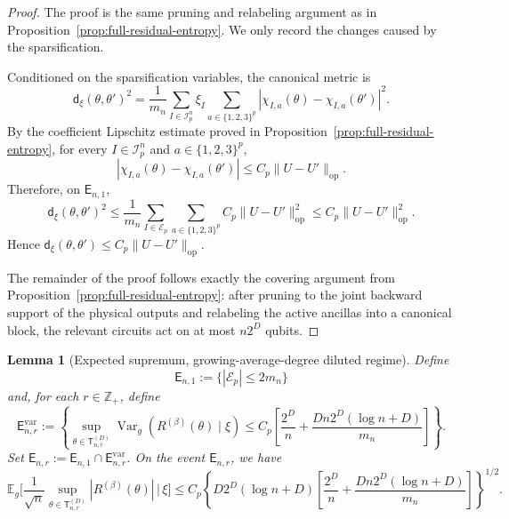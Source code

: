 \documentclass[12pt]{article}
\newtheorem{lemma}[theorem]{Lemma}
\newcommand{\E}{\mathbb{E}}
\newcommand{\mcE}{\mathcal{E}}
\newcommand{\mcI}{\mathcal{I}}
\newcommand{\tvar}{\operatorname{Var}}
\begin{document}
\begin{proof}
The proof is the same pruning and relabeling argument as in
Proposition~\ref{prop:full-residual-entropy}. We only record the changes caused by
the sparsification.

Conditioned on the sparsification variables, the canonical metric is
\[
\mathsf{d}_\xi(\theta,\theta')^2
=
\frac1{m_n}
\sum_{I\in\mcI_p^n}
\xi_I
\sum_{a\in\{1,2,3\}^p}
|\chi_{I,a}(\theta)-\chi_{I,a}(\theta')|^2 .
\]
By the coefficient Lipschitz estimate proved in
Proposition~\ref{prop:full-residual-entropy}, for every \(I\in\mcI_p^n\) and
\(a\in\{1,2,3\}^p\),
\[
    |\chi_{I,a}(\theta)-\chi_{I,a}(\theta')|
    \le
    C_p\|U-U'\|_{\mathrm{op}} .
\]
Therefore, on \(\mathsf E_{n,1}\),
\[
\mathsf{d}_\xi(\theta,\theta')^2
\le
\frac1{m_n}
\sum_{I\in\mcE_p}
\sum_{a\in\{1,2,3\}^p}
C_p\|U-U'\|_{\mathrm{op}}^2  
\le
C_p\|U-U'\|_{\mathrm{op}}^2.
\]
Hence \(\mathsf{d}_\xi(\theta,\theta') \le C_p\|U-U'\|_{\mathrm{op}}\).

The remainder of the proof follows exactly the covering argument from
Proposition~\ref{prop:full-residual-entropy}: after pruning to the joint backward
support of the physical outputs and relabeling the active ancillas into a
canonical block, the relevant circuits act on at most \(n2^D\) qubits. 
\end{proof}



\begin{lemma}[Expected supremum, growing-average-degree diluted regime]
\label{lem:sparse-residual-expected-sup}
Define
\[
    \mathsf E_{n,1}:=\{|\mcE_p|\le 2m_n\}
\]
and, for each \(r\in\mathbb Z_+\), define
\[
\mathsf E_{n,r}^{\mathrm{var}}
:=
\left\{
\sup_{\theta\in\mathsf{T}_{n,r}^{(D)}}
\tvar_g
\left(
R^{(\beta)}(\theta)\mid \xi
\right)
\le
C_p
\left[
\frac{2^D}{n}
+
\frac{Dn2^D(\log n+D)}{m_n}
\right]
\right\}.
\]
Set $\mathsf E_{n,r}:=\mathsf E_{n,1}\cap \mathsf E_{n,r}^{\mathrm{var}}$. On the event \(\mathsf E_{n,r}\), we have
\[
\E_g
\bigg[
\frac1{\sqrt n}
\sup_{\theta\in\mathsf{T}_{n,r}^{(D)}}
|R^{(\beta)}(\theta)|
\,\big | \, \xi
\bigg ]
\le
C_p
\left\{
D2^D (\log n+D)
\left[
\frac{2^D}{n}
+
\frac{Dn2^D(\log n+D)}{m_n}
\right]
\right\}^{1/2}.
\]
\end{lemma}
\end{document}
